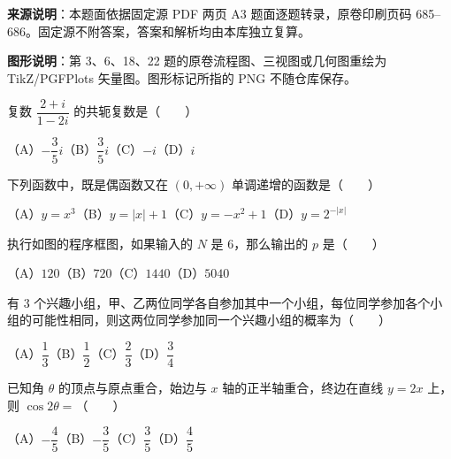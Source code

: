 


\begin{gktip}
\textbf{来源说明}：本题面依据固定源 PDF 两页 A3 题面逐题转录，原卷印刷页码 685–686。固定源不附答案，答案和解析均由本库独立复算。

\textbf{图形说明}：第 3、6、18、22 题的原卷流程图、三视图或几何图重绘为 TikZ/PGFPlots 矢量图。图形标记所指的 PNG 不随仓库保存。
\end{gktip}


\begin{question}
复数 $\dfrac{2+i}{1-2i}$ 的共轭复数是\mbox{（　　）}

（A）$-\dfrac35i$\quad（B）$\dfrac35i$\quad（C）$-i$\quad（D）$i$

\end{question}
\begin{question}
下列函数中，既是偶函数又在 $(0,+\infty)$ 单调递增的函数是\mbox{（　　）}

（A）$y=x^3$\quad（B）$y=|x|+1$\quad（C）$y=-x^2+1$\quad（D）$y=2^{-|x|}$

\Needspace{0.4\textheight}
\end{question}
\begin{question}
执行如图的程序框图，如果输入的 $N$ 是 $6$，那么输出的 $p$ 是\mbox{（　　）}
\nopagebreak[4]
\begin{center}\end{center}
\nopagebreak[4]
（A）$120$\quad（B）$720$\quad（C）$1440$\quad（D）$5040$

\end{question}
\begin{question}
有 $3$ 个兴趣小组，甲、乙两位同学各自参加其中一个小组，每位同学参加各个小组的可能性相同，则这两位同学参加同一个兴趣小组的概率为\mbox{（　　）}

（A）$\dfrac13$\quad（B）$\dfrac12$\quad（C）$\dfrac23$\quad（D）$\dfrac34$

\end{question}
\begin{question}
已知角 $\theta$ 的顶点与原点重合，始边与 $x$ 轴的正半轴重合，终边在直线 $y=2x$ 上，则 $\cos2\theta=$\mbox{（　　）}

（A）$-\dfrac45$\quad（B）$-\dfrac35$\quad（C）$\dfrac35$\quad（D）$\dfrac45$

\Needspace{0.4\textheight}
\end{question}
